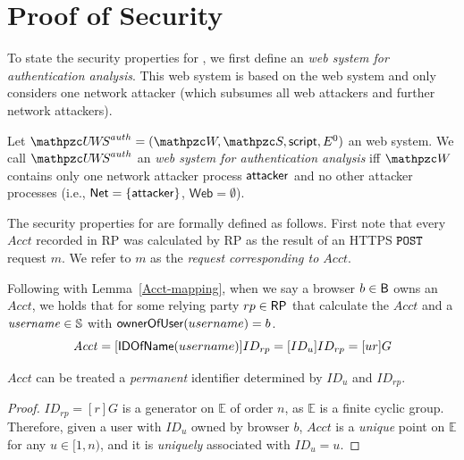   
  \section{Proof of Security}
  
  To state the security properties for \uppresso, we first
  define an \emph{\uppresso web system for authentication analysis}. This
  web system is based on the \uppresso web system and only considers one
  network attacker (which subsumes all web attackers and further network
  attackers).
  
  \begin{definition}
    Let $\uppressoauthwebsystem = (\bidsystem, \scriptset, \mathsf{script}, E^0)$
    an \uppresso web system. We call $\uppressoauthwebsystem$ an
    \emph{\uppresso web system for authentication analysis} iff
    $\bidsystem$ contains only one network attacker process
    $\mathsf{attacker}$ and no other attacker processes (i.e.,
    $\mathsf{Net} = \{\mathsf{attacker}\}$, $\mathsf{Web} = \emptyset$).
  \end{definition}
  
  The security properties for \uppresso are formally defined 
  as follows. First note that every $Acct$ recorded in RP was
  calculated by RP as the result of an HTTPS $\mathtt{POST}$ request 
  $m$. We refer to $m$ as the 
  \emph{request corresponding to $Acct$}. 
  
  \begin{definition}
    Following with Lemma~\ref{Acct-mapping}, when we say a browser 
    $b\in \mathsf{B}$ owns an $Acct$, we holds that for some relying 
    party $rp\in \mathsf{RP}$ that calculate the $Acct$ and 
    a $\mathit{username} \in \mathbb{S}$ with $\mathsf{ownerOfUser}(username) = b$.
    \[\mathit{Acct}=[\mathsf{IDOfName}(username)]ID_{rp}=[ID_u]ID_{rp}=[ur]G\]
  \end{definition}

  \newc
  \begin{lemma}\label{Acct-mapping}
    $Acct$ can be treated a \emph{permanent} identifier 
    determined by $ID_u$ and $ID_{rp}$. 
  \end{lemma}
  \begin{proof}
    $ID_{rp} = [r]G$ is a generator on $\mathbb{E}$ of order $n$, 
    as $\mathbb{E}$ is a finite cyclic group. 
    Therefore, given a user with $ID_u$ owned by browser $b$, $Acct$ is a \emph{unique} point on 
    $\mathbb{E}$ for any $u \in [1, n)$, and it is \emph{uniquely} 
    associated with $ID_u=u$.
  \end{proof}
  \oldc
  
